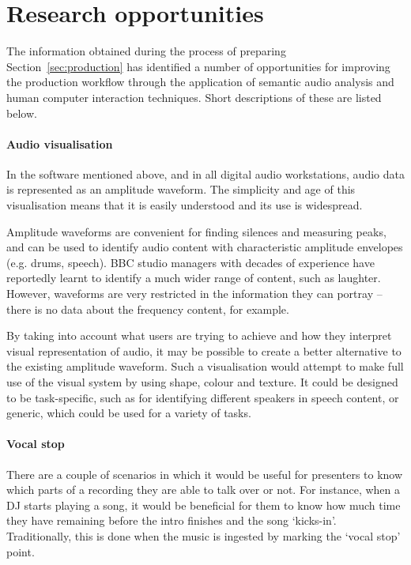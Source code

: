\section{Research opportunities}
The information obtained during the process of preparing
Section~\ref{sec:production} has identified a number of opportunities for
improving the production workflow through the application of semantic audio
analysis and human computer interaction techniques. Short descriptions of these
are listed below.

\paragraph{Audio visualisation}
In the software mentioned above, and in all digital audio workstations, audio
data is represented as an amplitude waveform. The simplicity and age of this
visualisation means that it is easily understood and its use is widespread.

Amplitude waveforms are convenient for finding silences and measuring peaks,
and can be used to identify audio content with characteristic amplitude
envelopes (e.g. drums, speech). BBC studio managers with decades of experience
have reportedly learnt to identify a much wider range of content, such as
laughter.  However, waveforms are very restricted in the information they can
portray -- there is no data about the frequency content, for example. 

By taking into account what users are trying to achieve and how they interpret
visual representation of audio, it may be possible to create a better
alternative to the existing amplitude waveform. Such a visualisation would
attempt to make full use of the visual system by using shape, colour and
texture. It could be designed to be task-specific, such as for identifying
different speakers in speech content, or generic, which could be used for a
variety of tasks.

\paragraph{Vocal stop}
There are a couple of scenarios in which it would be useful for presenters to
know which parts of a recording they are able to talk over or not. For
instance, when a DJ starts playing a song, it would be beneficial for them to
know how much time they have remaining before the intro finishes and the song
`kicks-in'. Traditionally, this is done when the music is ingested by marking
the `vocal stop' point.

